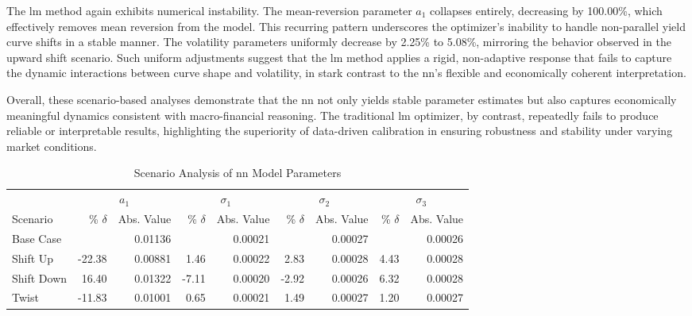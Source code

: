 The \ac{lm} method again exhibits numerical instability. The mean-reversion parameter \( a_1 \) collapses entirely, decreasing by 100.00\%, which effectively removes mean reversion from the model. This recurring pattern underscores the optimizer's inability to handle non-parallel yield curve shifts in a stable manner. The volatility parameters uniformly decrease by 2.25\% to 5.08\%, mirroring the behavior observed in the upward shift scenario. Such uniform adjustments suggest that the \ac{lm} method applies a rigid, non-adaptive response that fails to capture the dynamic interactions between curve shape and volatility, in stark contrast to the \ac{nn}'s flexible and economically coherent interpretation.

Overall, these scenario-based analyses demonstrate that the \ac{nn} not only yields stable parameter estimates but also captures economically meaningful dynamics consistent with macro-financial reasoning. The traditional \ac{lm} optimizer, by contrast, repeatedly fails to produce reliable or interpretable results, highlighting the superiority of data-driven calibration in ensuring robustness and stability under varying market conditions.

\begin{table}[H]
	\centering
	\setlength{\tabcolsep}{5pt}
	\caption{Scenario Analysis of \ac{nn} Model Parameters}
	\label{tab:scenario_analysis_part_nn}
	\begin{threeparttable}
		\begin{tabular}{l *{4}{rr}}
			\toprule
			           & \multicolumn{2}{c}{$a_1$} & \multicolumn{2}{c}{$\sigma_1$} & \multicolumn{2}{c}{$\sigma_2$} & \multicolumn{2}{c}{$\sigma_3$}                                                       \\
			\cmidrule(lr){2-3} \cmidrule(lr){4-5} \cmidrule(lr){6-7} \cmidrule(lr){8-9}
			Scenario   & \% $\delta$               & Abs. Value                     & \% $\delta$                    & Abs. Value                     & \% $\delta$ & Abs. Value & \% $\delta$ & Abs. Value \\
			\midrule

			Base Case  &                           & 0.01136                        &                                & 0.00021                        &             & 0.00027    &             & 0.00026    \\
			Shift Up   & -22.38                    & 0.00881                        & 1.46                           & 0.00022                        & 2.83        & 0.00028    & 4.43        & 0.00028    \\
			Shift Down & 16.40                     & 0.01322                        & -7.11                          & 0.00020                        & -2.92       & 0.00026    & 6.32        & 0.00028    \\
			Twist      & -11.83                    & 0.01001                        & 0.65                           & 0.00021                        & 1.49        & 0.00027    & 1.20        & 0.00027    \\
			\bottomrule
		\end{tabular}
	\end{threeparttable}
\end{table}

